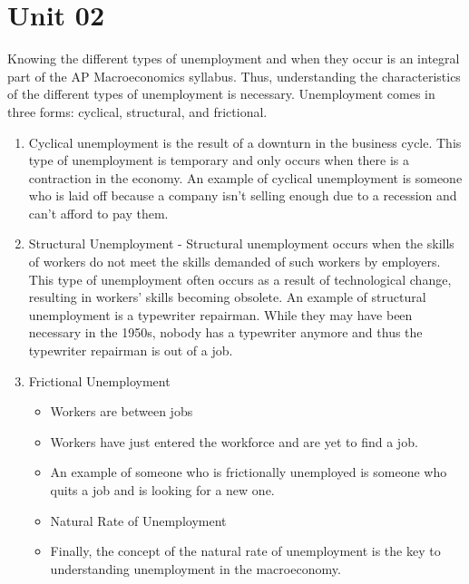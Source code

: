 \documentclass{scrreprt} %
\begin{document}
\section{Unit 02}

Knowing the different types of unemployment and when they occur is an integral
part of the AP Macroeconomics syllabus. Thus, understanding the characteristics
of the different types of unemployment is necessary. Unemployment comes in three
forms: cyclical, structural, and frictional.

\begin{enumerate}
	\item  Cyclical unemployment is the result of a downturn in the business cycle.
This type of unemployment is temporary and only occurs when there is a contraction in the economy.
An example of cyclical unemployment is someone who is laid off because a company isn't selling enough due to a recession and can't afford to pay them.

	\item Structural Unemployment - Structural unemployment occurs when the skills of workers do not meet the skills demanded of such workers by employers.
This type of unemployment often occurs as a result of technological change, resulting in workers’ skills becoming obsolete.
An example of structural unemployment is a typewriter repairman. While they may have been necessary in the 1950s, nobody has a typewriter anymore and thus the typewriter repairman is out of a job.
	\item Frictional Unemployment
\begin{itemize}
	\item Workers are between jobs
	\item Workers have just entered the workforce and are yet to find a job.
	\item An example of someone who is frictionally unemployed is someone who quits a job and is looking for a new one.
	\item Natural Rate of Unemployment
	\item Finally, the concept of the natural rate of unemployment is the key to
	understanding unemployment in the macroeconomy.
\end{itemize}
\end{enumerate}
\end{document}
